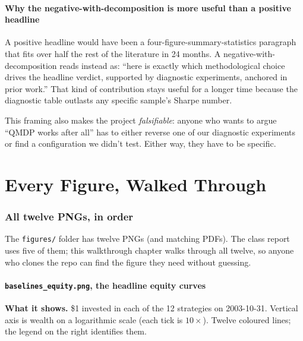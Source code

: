 \documentclass[11pt]{article}
\begin{document}
\subsection{Why the negative-with-decomposition is more useful than a positive headline}

A positive headline would have been a four-figure-summary-statistics paragraph that fits over half the rest of the literature in 24 months. A negative-with-decomposition reads instead as: ``here is exactly which methodological choice drives the headline verdict, supported by diagnostic experiments, anchored in prior work.'' That kind of contribution stays useful for a longer time because the diagnostic table outlasts any specific sample's Sharpe number.

This framing also makes the project \emph{falsifiable}: anyone who wants to argue ``QMDP works after all'' has to either reverse one of our diagnostic experiments or find a configuration we didn't test. Either way, they have to be specific.

\part{Every Figure, Walked Through}

\section{All twelve PNGs, in order}

The \texttt{figures/} folder has twelve PNGs (and matching PDFs). The class report uses five of them; this walkthrough chapter walks through all twelve, so anyone who clones the repo can find the figure they need without guessing.

\subsection{\texttt{baselines\_equity.png}, the headline equity curves}

\textbf{What it shows.} \$1 invested in each of the 12 strategies on 2003-10-31. Vertical axis is wealth on a logarithmic scale (each tick is $10\times$). Twelve coloured lines; the legend on the right identifies them.
\end{document}
